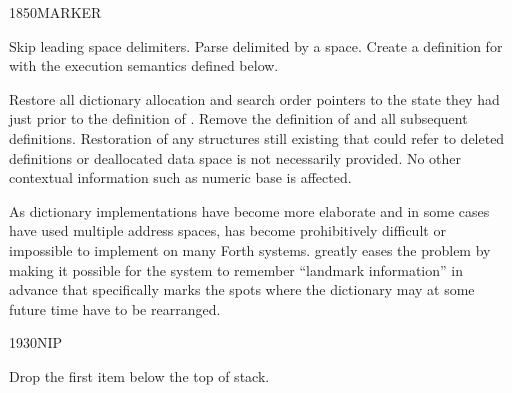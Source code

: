\begin{worddef}{1850}{MARKER}
\item {}

	Skip leading space delimiters. Parse  delimited by
	a space. Create a definition for  with the execution
	semantics defined below.

\execute[name]
	\stack{}{}

	Restore all dictionary allocation and search order pointers to
	the state they had just prior to the definition of .
	Remove the definition of  and all subsequent
	definitions. Restoration of any structures still existing that
	could refer to deleted definitions or deallocated data space is
	not necessarily provided. No other contextual information such
	as numeric base is affected.


	\begin{rationale} %
		As dictionary implementations have become more elaborate
		and in some cases have used multiple address spaces,
		 has become prohibitively difficult or
		impossible to implement on many Forth systems. 
		greatly eases the problem by making it possible for the
		system to remember ``landmark information'' in advance that
		specifically marks the spots where the dictionary may at some
		future time have to be rearranged.
	\end{rationale}
\end{worddef}

\enlargethispage{8ex}
\begin{worddef}{1930}{NIP}
\item {}

	Drop the first item below the top of stack.
\end{worddef}


